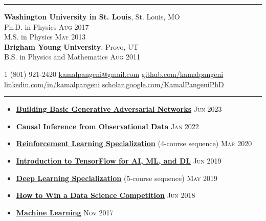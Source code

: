 \documentclass[10pt,letterpaper]{article}
\begin{document}
\hrule
\vspace{0.8ex}
\textbf{Washington University in St. Louis}, St. Louis, MO \\
Ph.D. in Physics \hfill \textsc{Aug 2017} \\
M.S. in Physics \hfill \textsc{May 2013} \\[0.5ex]
\textbf{Brigham Young University}, Provo, UT \\
B.S. in Physics and Mathematics \hfill \textsc{Aug 2011}

\newpage
{}

\noindent\textsmaller{+}1 (801) 921-2420\bull
\href{mailto:kamalpangeni@gmail.com}{kamalpangeni@gmail.com}\bull
\href{https://github.com/kamalpangeni}{github.com/kamalpangeni}\\
\href{https://www.linkedin.com/in/kamal-pangeni-31242a29/}{linkedin.com/in/kamalpangeni}\bull
\href{https://scholar.google.com/citations?user=MJPS73gAAAAJ&hl=en}{scholar.google.com/\textsmaller{+}KamalPangeniPhD}

\vspace{0.8ex}
\hrule
\vspace{0.8ex}
\begin{itemize}
\item \href{https://www.coursera.org/account/accomplishments/certificate/BUL4BCDP55V6}{\textbf{Building Basic Generative Adversarial Networks}} \hfill \textsc{Jun 2023}
\item \href{https://www.coursera.org/account/accomplishments/certificate/VZHHWVMY9JFT}{\textbf{Causal Inference from Observational Data}} \hfill \textsc{Jan 2022}
\item \href{https://www.coursera.org/account/accomplishments/specialization/86SNN7EEXUL2}{\textbf{Reinforcement Learning Specialization}} (4-course sequence) \hfill \textsc{Mar 2020}
\item \href{https://www.coursera.org/account/accomplishments/certificate/KFLEJGRZMYQZ}{\textbf{Introduction to TensorFlow for AI, ML, and DL}} \hfill \textsc{Jun 2019}
\item \href{https://www.coursera.org/account/accomplishments/specialization/P8F8U69WUCVD}{\textbf{Deep Learning Specialization}} (5-course sequence) \hfill \textsc{May 2019}
\item \href{https://www.coursera.org/account/accomplishments/verify/WAQ4WS7BCBDS}{\textbf{How to Win a Data Science Competition}} \hfill \textsc{Jun 2018}
\item \href{https://www.coursera.org/account/accomplishments/certificate/R3Q26XAHTCHD}{\textbf{Machine Learning}} \hfill \textsc{Nov 2017}
\end{itemize}
\end{document}
